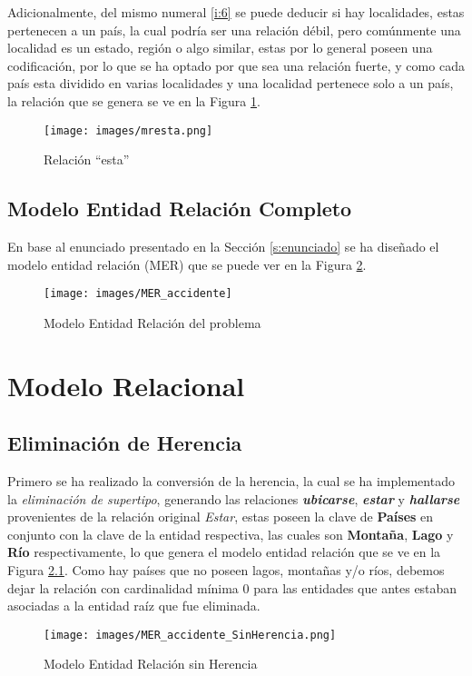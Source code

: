 \documentclass[letter,12pt]{report}
\begin{document}
Adicionalmente, del mismo numeral \ref{i:6} se puede deducir si hay localidades, estas pertenecen a un país, la cual podría ser una relación débil, pero comúnmente una localidad es un estado, región o algo similar, estas por lo general poseen una codificación, por lo que se ha optado por que sea una relación fuerte, y como cada país esta dividido en varias localidades y una localidad pertenece solo a un país, la relación que se genera se ve en la Figura \ref{f:esta}.

\begin{figure}[H]
\centering
\texttt{[image: images/mresta.png]}
  \caption{Relación ``esta''}
  \label{f:esta}
\end{figure}

\begin{landscape}
\section{Modelo Entidad Relación Completo}
En base al enunciado presentado en la Sección \ref{s:enunciado} se ha diseñado el modelo entidad relación (MER) que se puede ver en la Figura \ref{f:mercompleto}.

\begin{figure}[hbt]
\centering
  \texttt{[image: images/MER\_accidente]}
  \caption{Modelo Entidad Relación del problema}
  \label{f:mercompleto}
\end{figure}
\end{landscape}


\chapter{Modelo Relacional}
\section{Eliminación de Herencia}\label{elimher}

Primero se ha realizado la conversión de la herencia, la cual se ha implementado la \textit{eliminación de supertipo}, generando las relaciones \textbf{\textit{ubicarse}}, \textbf{\textit{estar}} y \textbf{\textit{hallarse}} provenientes de la relación original \textit{Estar}, estas poseen la clave de \textbf{Países} en conjunto con la clave de la entidad respectiva, las cuales son \textbf{Montaña}, \textbf{Lago} y \textbf{Río} respectivamente, lo que genera el modelo entidad relación que se ve en la Figura \ref{f:mersinherencia}. Como hay países que no poseen lagos, montañas y/o ríos, debemos dejar la relación con cardinalidad mínima 0 para las entidades que antes estaban asociadas a la entidad raíz que fue eliminada.
\begin{figure}[hbt]
\centering
  \texttt{[image: images/MER\_accidente\_SinHerencia.png]}
  \caption{Modelo Entidad Relación sin Herencia}
  \label{f:mersinherencia}
\end{figure}
\end{document}
